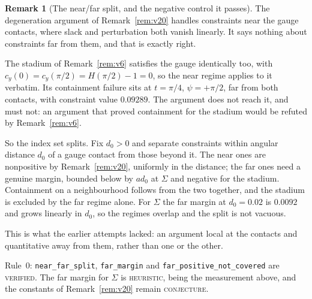 \documentclass[11pt]{article}
\theoremstyle{definition}
\newtheorem{remark}[theorem]{Remark}
\newcommand{\Sig}{\Sigma}
\begin{document}
\begin{remark}[The near/far split, and the negative control it passes]\label{rem:v21}
The degeneration argument of Remark~\ref{rem:v20} handles constraints near the gauge contacts,
where slack and perturbation both vanish linearly. It says nothing about constraints far from
them, and that is exactly right.

The stadium of Remark~\ref{rem:v6} satisfies the gauge identically too, with
$c_y(0)=c_y(\pi/2)=H(\pi/2)-1=0$, so the near regime applies to it verbatim. Its containment
failure sits at $t=\pi/4$, $\psi=+\pi/2$, far from both contacts, with constraint value
$0.09289$. The argument does not reach it, and must not: an argument that proved containment
for the stadium would be refuted by Remark~\ref{rem:v6}.

So the index set splits. Fix $d_0>0$ and separate constraints within angular distance $d_0$ of
a gauge contact from those beyond it. The near ones are nonpositive by
Remark~\ref{rem:v20}, uniformly in the distance; the far ones need a genuine margin, bounded
below by $ad_0$ at $\Sig$ and negative for the stadium. Containment on a neighbourhood follows
from the two together, and the stadium is excluded by the far regime alone. For $\Sig$ the far
margin at $d_0=0.02$ is $0.0092$ and grows linearly in $d_0$, so the regimes overlap and the
split is not vacuous.

This is what the earlier attempts lacked: an argument local at the contacts and quantitative
away from them, rather than one or the other.

Rule~0: \verb|near_far_split|, \verb|far_margin| and \verb|far_positive_not_covered| are
\textsc{verified}. The far margin for $\Sig$ is \textsc{heuristic}, being the measurement
above, and the constants of Remark~\ref{rem:v20} remain \textsc{conjecture}.
\end{remark}
\end{document}
